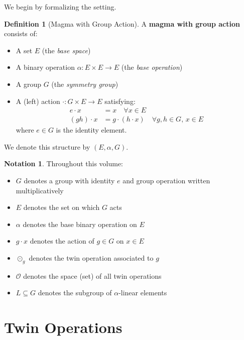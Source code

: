 \documentclass[11pt,a4paper,openany]{book}
\theoremstyle{plain}
\theoremstyle{definition}
\newtheorem{definition}[theorem]{Definition}
\newtheorem{notation}[theorem]{Notation}
\newcommand{\twing}[1]{\odot_{#1}}
\newcommand{\opspace}{\mathcal{O}}
\newcommand{\lingroup}{L}
\newcommand{\actspace}{E}
\newcommand{\groupG}{G}
\begin{document}
We begin by formalizing the setting.

\begin{definition}[Magma with Group Action]\label{def:magma-action}
A \textbf{magma with group action} consists of:
\begin{itemize}
    \item A set $\actspace$ (the \emph{base space})
    \item A binary operation $\alpha: \actspace \times \actspace \to \actspace$ (the \emph{base operation})
    \item A group $\groupG$ (the \emph{symmetry group})
    \item A (left) action $\cdot : \groupG \times \actspace \to \actspace$ satisfying:
    \begin{align}
        e \cdot x &= x \quad \forall x \in \actspace \label{eq:action-id}\\
        (gh) \cdot x &= g \cdot (h \cdot x) \quad \forall g,h \in \groupG,\, x \in \actspace \label{eq:action-comp}
    \end{align}
    where $e \in \groupG$ is the identity element.
\end{itemize}
We denote this structure by $(\actspace, \alpha, \groupG)$.
\end{definition}

\begin{notation}\label{not:conventions}
Throughout this volume:
\begin{itemize}
    \item $\groupG$ denotes a group with identity $e$ and group operation written multiplicatively
    \item $\actspace$ denotes the set on which $\groupG$ acts
    \item $\alpha$ denotes the base binary operation on $\actspace$
    \item $g \cdot x$ denotes the action of $g \in \groupG$ on $x \in \actspace$
    \item $\twing{g}$ denotes the twin operation associated to $g$
    \item $\opspace$ denotes the space (set) of all twin operations
    \item $\lingroup \subseteq \groupG$ denotes the subgroup of $\alpha$-linear elements
\end{itemize}
\end{notation}

\section{Twin Operations}
\end{document}

